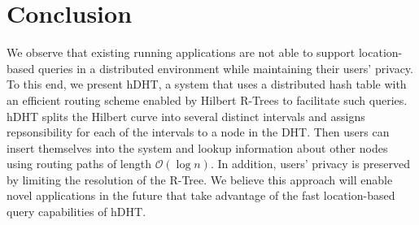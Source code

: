 \section{Conclusion} \label{section:conclusion}
We observe that existing running applications are not able to support location-based queries in a distributed environment while maintaining their users' privacy. To this end, we present hDHT, a system that uses a distributed hash table with an efficient routing scheme enabled by Hilbert R-Trees to facilitate such queries. hDHT splits the Hilbert curve into several distinct intervals and assigns repsonsibility for each of the intervals to a node in the DHT. Then users can insert themselves into the system and lookup information about other nodes using routing paths of length $\mathcal{O}(\log n)$. In addition, users' privacy is preserved by limiting the resolution of the R-Tree. We believe this approach will enable novel applications in the future that take advantage of the fast location-based query capabilities of hDHT.